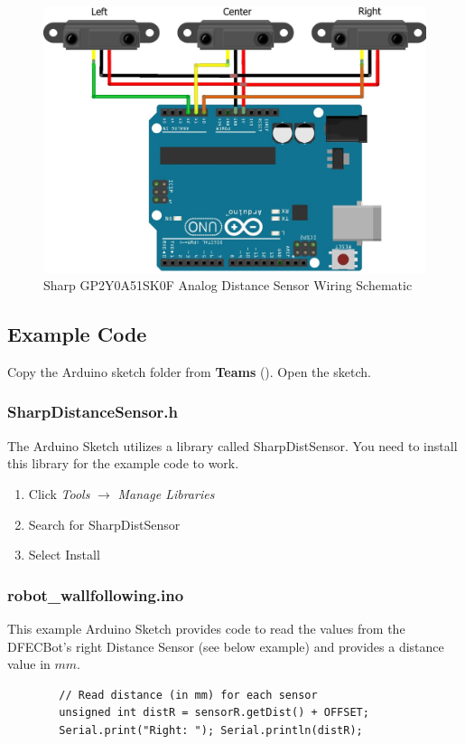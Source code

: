 \documentclass{handout}
\begin{document}
	\begin{figure} [H]
		\centering
		\includegraphics[width=.75\textwidth]{ir.jpg}
		\caption{Sharp GP2Y0A51SK0F Analog Distance Sensor Wiring Schematic}
		\label{Fig IR}
	\end{figure}

	\newpage
\clearpage
\pagebreak

	
	\subsection{Example Code}
	Copy the Arduino sketch folder   from \textbf{Teams} (). Open the  sketch.
	
	\subsubsection{SharpDistanceSensor.h}
	The Arduino Sketch utilizes a library called SharpDistSensor. You need to install this library for the example code to work.
	\begin{enumerate}
		\item Click \textit{Tools} $\rightarrow$ \textit{Manage Libraries}
		\item Search for SharpDistSensor
		\item Select Install
	\end{enumerate}
	
	\subsubsection{robot\_wallfollowing.ino}
	This example Arduino Sketch provides code to read the values from the DFECBot's right Distance Sensor (see below example) and provides a distance value in $mm$.
	
	\begin{lstlisting}
		// Read distance (in mm) for each sensor
		unsigned int distR = sensorR.getDist() + OFFSET;
		Serial.print("Right: "); Serial.println(distR);
	\end{lstlisting}
	
\end{document}
